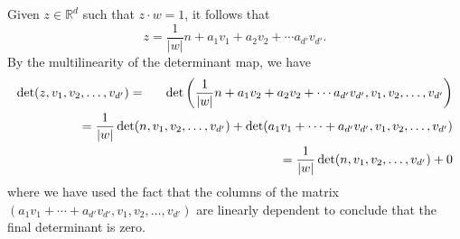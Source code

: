 \documentclass[smallextended]{svjour3}
\theoremstyle{remark}
\renewenvironment{proof}[1][\proofname]{\renewcommand\xproofname{#1}\xproof}{\endxproof}
\renewcommand\det{\operatorname{det}}
\newcommand{\lp}{\left(}
\newcommand{\rp}{\right)}
\begin{document}
\begin{proof}
Given $z\in\mathbb{R}^d$ such that $z\cdot w=1$, it follows that 
\begin{equation*}
z=\frac{1}{|w|}n+a_1v_1+a_2v_2+\cdots a_{d'}v_{d'}.
\end{equation*}
By the multilinearity of the determinant map, we have
\begin{eqnarray*}
\det(z,v_1,v_2,\dots,v_{d'}) &=&\det\lp \frac{1}{|w|}n+a_1v_2+a_2v_2+\cdots a_{d'} v_{d'},v_1,v_2,\dots,v_{d'}\rp\\
&&\hspace{-0.8in}=\frac{1}{|w|}\det(n,v_1,v_2,\dots,v_{d'})+\det(a_1v_1+\cdots+a_{d'} v_{d'}, v_1,v_2,\dots,v_{d'})\\
&&\hspace{-0.8in}=\frac{1}{|w|}\det(n, v_1,v_2,\dots,v_{d'})+0
\end{eqnarray*}
where we have used the fact that the columns of the matrix $(a_1v_1+\cdots+a_{d'} v_{d'}, v_1,v_2,\dots,v_{d'})$ are linearly dependent to conclude that the final determinant is zero.
\end{proof}
\end{document}
